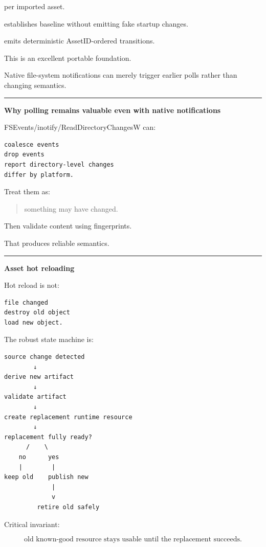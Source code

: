 per imported asset.

 establishes baseline without emitting fake startup changes.

 emits deterministic AssetID-ordered transitions.

This is an excellent portable foundation.

Native file-system notifications can merely trigger earlier polls rather than changing semantics.

\begin{center}\rule{0.5\linewidth}{0.5pt}\end{center}

\textbf{Why polling remains valuable even with native notifications}

FSEvents/inotify/ReadDirectoryChangesW can:

\begin{verbatim}
coalesce events
drop events
report directory-level changes
differ by platform.
\end{verbatim}

Treat them as:

\begin{quote}
something may have changed.
\end{quote}

Then validate content using fingerprints.

That produces reliable semantics.

\begin{center}\rule{0.5\linewidth}{0.5pt}\end{center}

\textbf{Asset hot reloading}

Hot reload is not:

\begin{verbatim}
file changed
destroy old object
load new object.
\end{verbatim}

The robust state machine is:

\begin{verbatim}
source change detected
        ↓
derive new artifact
        ↓
validate artifact
        ↓
create replacement runtime resource
        ↓
replacement fully ready?
      /    \
    no      yes
    |        |
keep old    publish new
             |
             v
         retire old safely
\end{verbatim}

Critical invariant:

\[
\boxed{
\text{old known-good resource stays usable until the replacement succeeds.}
}
\]

